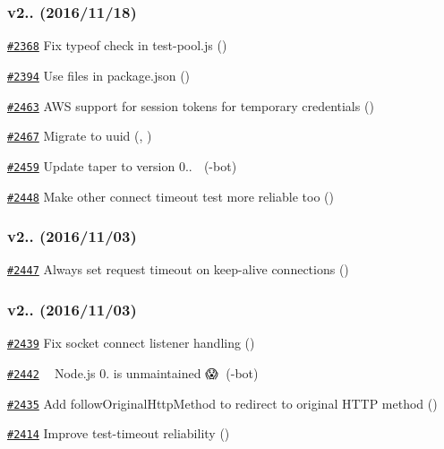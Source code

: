 \subsubsection*{v2.. (2016/11/18)}


\begin{DoxyItemize}
\item \href{https://github.com/request/request/pull/2368}{\tt \#2368} Fix typeof check in test-\/pool.\+js ()
\item \href{https://github.com/request/request/pull/2394}{\tt \#2394} Use {\ttfamily files} in package.\+json ()
\item \href{https://github.com/request/request/pull/2463}{\tt \#2463} A\+WS support for session tokens for temporary credentials ()
\item \href{https://github.com/request/request/pull/2467}{\tt \#2467} Migrate to uuid (, )
\item \href{https://github.com/request/request/pull/2459}{\tt \#2459} Update taper to version 0.. 🚀 (-\/bot)
\item \href{https://github.com/request/request/pull/2448}{\tt \#2448} Make other connect timeout test more reliable too ()
\end{DoxyItemize}

\subsubsection*{v2.. (2016/11/03)}


\begin{DoxyItemize}
\item \href{https://github.com/request/request/pull/2447}{\tt \#2447} Always set request timeout on keep-\/alive connections ()
\end{DoxyItemize}

\subsubsection*{v2.. (2016/11/03)}


\begin{DoxyItemize}
\item \href{https://github.com/request/request/pull/2439}{\tt \#2439} Fix socket \textquotesingle{}connect\textquotesingle{} listener handling ()
\item \href{https://github.com/request/request/pull/2442}{\tt \#2442} 👻😱 Node.\+js 0. is unmaintained 😱👻 (-\/bot)
\item \href{https://github.com/request/request/pull/2435}{\tt \#2435} Add follow\+Original\+Http\+Method to redirect to original H\+T\+TP method ()
\item \href{https://github.com/request/request/pull/2414}{\tt \#2414} Improve test-\/timeout reliability ()
\end{DoxyItemize}

